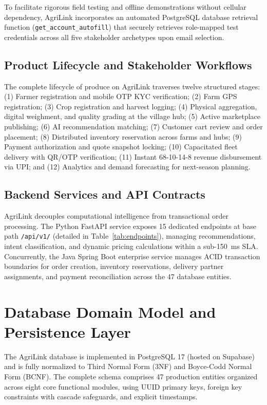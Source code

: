 To facilitate rigorous field testing and offline demonstrations without cellular dependency, AgriLink incorporates an automated PostgreSQL database retrieval function (\texttt{get\_account\_autofill}) that securely retrieves role-mapped test credentials across all five stakeholder archetypes upon email selection.

\subsection{Product Lifecycle and Stakeholder Workflows}
The complete lifecycle of produce on AgriLink traverses twelve structured stages:
(1) Farmer registration and mobile OTP KYC verification; (2) Farm GPS registration; (3) Crop registration and harvest logging; (4) Physical aggregation, digital weighment, and quality grading at the village hub; (5) Active marketplace publishing; (6) AI recommendation matching; (7) Customer cart review and order placement; (8) Distributed inventory reservation across farms and hubs; (9) Payment authorization and quote snapshot locking; (10) Capacitated fleet delivery with QR/OTP verification; (11) Instant 68-10-14-8 revenue disbursement via UPI; and (12) Analytics and demand forecasting for next-season planning.

\subsection{Backend Services and API Contracts}
AgriLink decouples computational intelligence from transactional order processing. The Python FastAPI service exposes 15 dedicated endpoints at base path \texttt{/api/v1/} (detailed in Table~\ref{tab:endpoints}), managing recommendations, intent classification, and dynamic pricing calculations within a sub-150~ms SLA. Concurrently, the Java Spring Boot enterprise service manages ACID transaction boundaries for order creation, inventory reservations, delivery partner assignments, and payment reconciliation across the 47 database entities.

\section{Database Domain Model and Persistence Layer}
\label{sec:database_design}
The AgriLink database is implemented in PostgreSQL 17 (hosted on Supabase) and is fully normalized to Third Normal Form (3NF) and Boyce-Codd Normal Form (BCNF). The complete schema comprises 47 production entities organized across eight core functional modules, using UUID primary keys, foreign key constraints with cascade safeguards, and explicit timestamps.

